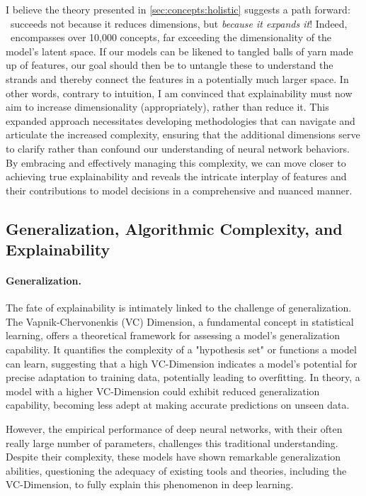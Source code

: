 I believe the theory presented in \autoref{sec:concepts:holistic} suggests a path forward: \craft~succeeds not because it reduces dimensions, but \textit{because it expands it}! Indeed, \Lens~encompasses over 10,000 concepts, far exceeding the dimensionality of the model's latent space. If our models can be likened to tangled balls of yarn made up of features, our goal should then be to untangle these to understand the strands and thereby connect the features in a potentially much larger space. In other words, contrary to intuition, I am convinced that explainability must now aim to increase dimensionality (appropriately), rather than reduce it. This expanded approach necessitates developing methodologies that can navigate and articulate the increased complexity, ensuring that the additional dimensions serve to clarify rather than confound our understanding of neural network behaviors. By embracing and effectively managing this complexity, we can move closer to achieving true explainability and reveals the intricate interplay of features and their contributions to model decisions in a comprehensive and nuanced manner.


\subsection{Generalization, Algorithmic Complexity, and Explainability}

\paragraph{Generalization.}
The fate of explainability is intimately linked to the challenge of generalization. The Vapnik-Chervonenkis (VC) Dimension, a fundamental concept in statistical learning, offers a theoretical framework for assessing a model's generalization capability. It quantifies the complexity of a "hypothesis set" or functions a model can learn, suggesting that a high VC-Dimension indicates a model's potential for precise adaptation to training data, potentially leading to overfitting. In theory, a model with a higher VC-Dimension could exhibit reduced generalization capability, becoming less adept at making accurate predictions on unseen data.

However, the empirical performance of deep neural networks, with their often really large number of parameters, challenges this traditional understanding. Despite their complexity, these models have shown remarkable generalization abilities, questioning the adequacy of existing tools and theories, including the VC-Dimension, to fully explain this phenomenon in deep learning.

